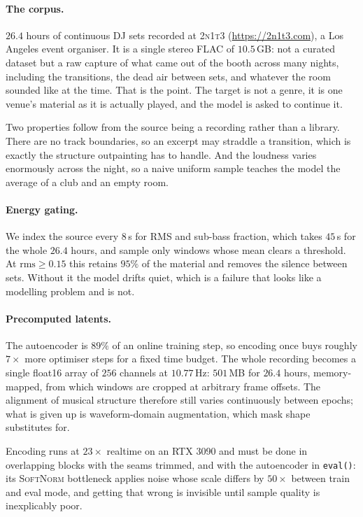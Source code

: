 \documentclass[10pt,twocolumn,letterpaper]{article}
\begin{document}
\paragraph{The corpus.} $26.4$ hours of continuous DJ sets recorded at
\textsc{2n1t3} (\url{https://2n1t3.com}), a Los Angeles event organiser. It is a
single stereo FLAC of $10.5$\,GB: not a curated dataset but a raw capture of what
came out of the booth across many nights, including the transitions, the dead air
between sets, and whatever the room sounded like at the time. That is the point.
The target is not a genre, it is one venue's material as it is actually played,
and the model is asked to continue it.

Two properties follow from the source being a recording rather than a library.
There are no track boundaries, so an excerpt may straddle a transition, which is
exactly the structure outpainting has to handle. And the loudness varies enormously
across the night, so a naive uniform sample teaches the model the average of
a club and an empty room.

\paragraph{Energy gating.} We index the source every $8$\,s for RMS and sub-bass
fraction, which takes $45$\,s for the whole $26.4$ hours, and sample only windows
whose mean clears a threshold. At $\text{rms} \geq 0.15$ this retains $95\%$ of
the material and removes the silence between sets. Without it the model drifts
quiet, which is a failure that looks like a modelling problem and is not.

\paragraph{Precomputed latents.} The autoencoder is $89\%$ of an online training
step, so encoding once buys roughly $7\times$ more optimiser steps for a fixed
time budget. The whole recording becomes a single float16 array of $256$ channels
at $10.77$\,Hz: $501$\,MB for $26.4$ hours, memory-mapped, from which windows are
cropped at arbitrary frame offsets. The alignment of musical structure therefore
still varies continuously between epochs; what is given up is waveform-domain
augmentation, which mask shape substitutes for.

Encoding runs at $23\times$ realtime on an RTX 3090 and must be done in
overlapping blocks with the seams trimmed, and with the autoencoder in
\texttt{eval()}: its \textsc{SoftNorm} bottleneck applies noise whose scale differs
by $50\times$ between train and eval mode, and getting that wrong is invisible
until sample quality is inexplicably poor.
\end{document}
